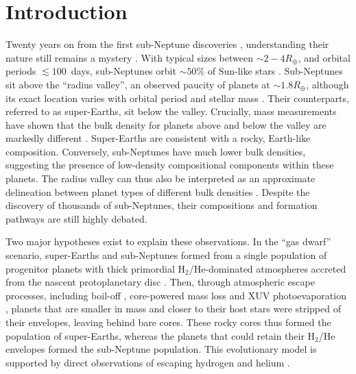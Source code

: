 \documentclass[fleqn,usenatbib]{mnras}
\begin{document}
\section{Introduction} \label{sec:intro}
Twenty years on from the first sub-Neptune discoveries \citep{Santos2004,Rivera2005}, understanding their nature still remains a mystery \citep[e.g.][]{Bean2021}.  With typical sizes between $\sim2 - 4 R_\oplus$, and orbital periods $\lesssim 100$~days, sub-Neptunes orbit $\sim 50\%$ of Sun-like stars \citep{Petigura2013,Batalha2013,Fressin2013}. Sub-Neptunes sit above the ``radius valley'', an observed paucity of planets at $\sim 1.8R_\oplus$, although its exact location varies with orbital period and stellar mass \citep[e.g.][]{Fulton2017,Petigura2018,VanEylen2018,Petigura2022,Ho2023}. Their counterparts, referred to as super-Earths, sit below the valley. Crucially, mass measurements have shown that the bulk density for planets above and below the valley are markedly different \citep[e.g.][]{Wu_Lithwick2013,Weiss2014,Rogers2015,Wolfgang2016,Chen2017}. Super-Earths are consistent with a rocky, Earth-like composition. Conversely, sub-Neptunes have much lower bulk densities, suggesting the presence of low-density compositional components within these planets. The radius valley can thus also be interpreted as an approximate delineation between planet types of different bulk densities \citep{Luque2022}. Despite the discovery of thousands of sub-Neptunes, their compositions and formation pathways are still highly debated.

Two major hypotheses exist to explain these observations. In the ``gas dwarf'' scenario, super-Earths and sub-Neptunes formed from a single population of progenitor planets with thick primordial H$_2$/He-dominated atmospheres accreted from the nascent protoplanetary disc \citep[e.g.][]{Lee2014,Ginzburg2016}. Then, through atmospheric escape processes, including boil-off \citep{Owen2016,Ginzburg2016}, core-powered mass loss \citep{Ginzburg2018} and XUV photoevaporation \citep{Owen2013,LopezFortney2013}, planets that are smaller in mass and closer to their host stars were stripped of their envelopes, leaving behind bare cores. These rocky cores thus formed the population of super-Earths, whereas the planets that could retain their H$_2$/He envelopes formed the sub-Neptune population. This evolutionary model is supported by direct observations of escaping hydrogen and helium \citep[e.g.][]{DosSantos2023a}.

\end{document}
